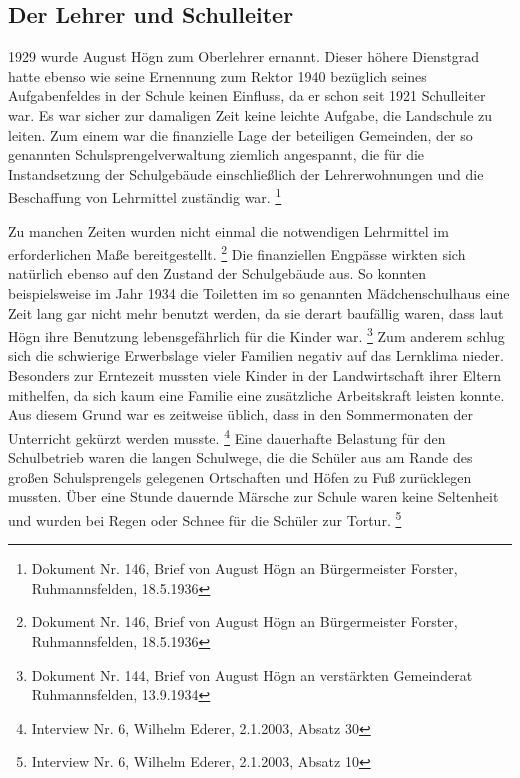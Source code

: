 \subsection{Der Lehrer und Schulleiter}

1929 wurde August Högn zum
Oberlehrer ernannt. Dieser höhere Dienstgrad hatte ebenso wie seine
Ernennung zum Rektor 1940 bezüglich seines Aufgabenfeldes in der Schule
keinen Einfluss, da er schon seit 1921 Schulleiter war. Es war sicher
zur damaligen Zeit keine leichte Aufgabe, die Landschule zu leiten. Zum
einem war die finanzielle Lage der beteiligen Gemeinden, der so
genannten Schulsprengelverwaltung ziemlich angespannt, die für die
Instandsetzung der Schulgebäude einschließlich der Lehrerwohnungen und
die Beschaffung von Lehrmittel zuständig war. \footnote{Dokument Nr.
146, Brief von August Högn an Bürgermeister Forster, Ruhmannsfelden,
18.5.1936}

Zu manchen Zeiten wurden nicht einmal die notwendigen Lehrmittel im
erforderlichen Maße bereitgestellt. \footnote{Dokument Nr. 146, Brief
von August Högn an Bürgermeister Forster, Ruhmannsfelden, 18.5.1936}
Die finanziellen Engpässe wirkten sich natürlich ebenso auf den Zustand
der Schulgebäude aus. So konnten beispielsweise im Jahr 1934 die
Toiletten im so genannten Mädchenschulhaus eine Zeit lang gar nicht
mehr benutzt werden, da sie derart baufällig waren, dass laut Högn ihre
Benutzung lebensgefährlich für die Kinder war. \footnote{Dokument Nr.
144, Brief von August Högn an verstärkten Gemeinderat Ruhmannsfelden,
13.9.1934} Zum anderem schlug sich die schwierige Erwerbslage vieler
Familien negativ auf das Lernklima nieder. Besonders zur Erntezeit
mussten viele Kinder in der Landwirtschaft ihrer Eltern mithelfen, da
sich kaum eine Familie eine zusätzliche Arbeitskraft leisten konnte.
Aus diesem Grund war es zeitweise üblich, dass in den Sommermonaten der
Unterricht gekürzt werden musste. \footnote{Interview Nr. 6, Wilhelm
Ederer, 2.1.2003, Absatz 30} Eine dauerhafte Belastung für den
Schulbetrieb waren die langen Schulwege, die die Schüler aus am Rande
des großen Schulsprengels gelegenen Ortschaften und Höfen zu Fuß
zurücklegen mussten. Über eine Stunde dauernde Märsche zur Schule waren
keine Seltenheit und wurden bei Regen oder Schnee für die Schüler zur
Tortur. \footnote{Interview Nr. 6, Wilhelm Ederer, 2.1.2003, Absatz 10}

